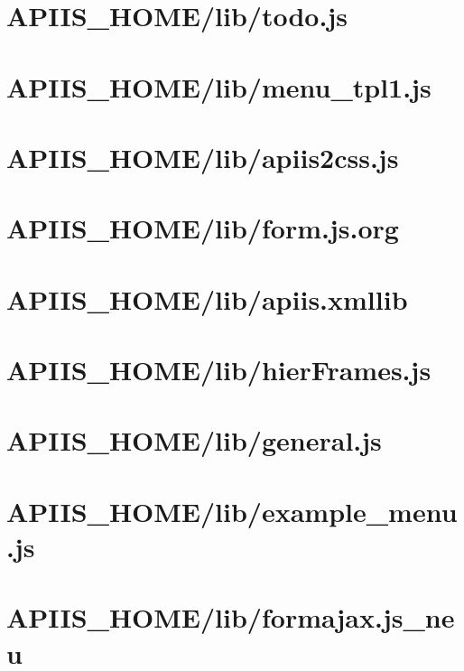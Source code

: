 \section{APIIS\_HOME/lib/todo.js} 
\section{APIIS\_HOME/lib/menu\_tpl1.js} 
\section{APIIS\_HOME/lib/apiis2css.js} 
\section{APIIS\_HOME/lib/form.js.org} 
\section{APIIS\_HOME/lib/apiis.xmllib} 
\section{APIIS\_HOME/lib/hierFrames.js} 
\section{APIIS\_HOME/lib/general.js} 
\section{APIIS\_HOME/lib/example\_menu.js} 
\section{APIIS\_HOME/lib/formajax.js\_neu} 
